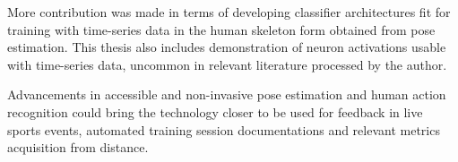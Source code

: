 More contribution was made in terms of developing classifier architectures fit for training with time-series data in the human skeleton form obtained from pose estimation. This thesis also includes demonstration of neuron activations usable with time-series data, uncommon in relevant literature processed by the author. 

Advancements in accessible and non-invasive pose estimation and human action recognition could bring the technology closer to be used for feedback in live sports events, automated training session documentations and relevant metrics acquisition from distance.










